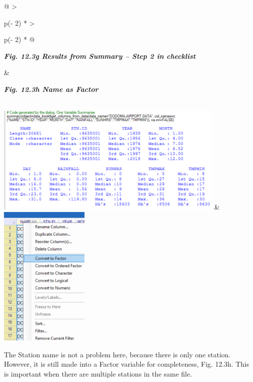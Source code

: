\documentclass[
  letterpaper,
  DIV=11,
  numbers=noendperiod]{scrreprt}
\begin{document}
\begin{longtable}[]{@{}
  >{\raggedright\arraybackslash}p{(\columnwidth - 2\tabcolsep) * }
  >{\raggedright\arraybackslash}p{(\columnwidth - 2\tabcolsep) * }@{}}
\toprule\noalign{}
\begin{minipage}[b]{\linewidth}\raggedright
\textbf{\emph{Fig. 12.3g Results from Summary -- Step 2 in checklist}}
\end{minipage} & \begin{minipage}[b]{\linewidth}\raggedright
\textbf{\emph{Fig. 12.3h Name as Factor}}
\end{minipage} \\
\midrule\noalign{}
\endhead
\bottomrule\noalign{}
\endlastfoot
\includegraphics[width=4.38314in,height=2.08182in]{figures/Fig12.3g.png}
&
\includegraphics[width=1.69775in,height=2.7145in]{figures/Fig12.3h.png} \\
\end{longtable}

The Station name is not a problem here, because there is only one
station. However, it is still made into a Factor variable for
completeness, Fig. 12.3h. This is important when there are multiple
stations in the same file.
\end{document}
